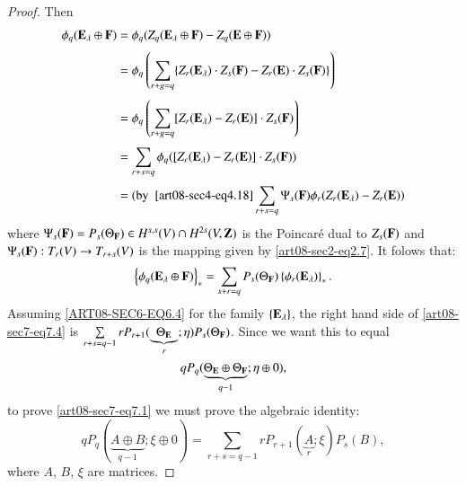 \begin{proof}
Then\pageoriginale
\begin{align*}
\phi_{q}(\mathbf{E}_{\lambda}\oplus\mathbf{F}) &= \phi_{q}(Z_{q}(\mathbf{E}_{\lambda}\oplus\mathbf{F})-Z_{q}(\mathbf{E}\oplus \mathbf{F}))\\[3pt]
&= \phi_{q}\left(\sum\limits_{r+g=q}\{Z_{r}(\mathbf{E}_{\lambda})\cdot Z_{s}(\mathbf{F})-Z_{r}(\mathbf{E})\cdot Z_{s}(\mathbf{F})\}\right)\\[3pt]
&= \phi_{q}\left(\sum\limits_{r+g=q}[Z_{r}(\mathbf{E}_{\lambda})-Z_{r}(\mathbf{E})]\cdot Z_{s}(\mathbf{F})\right)\\[3pt]
&= \sum\limits_{r+s=q}\phi_{q}([Z_{r}(\mathbf{E}_{\lambda})-Z_{r}(\mathbf{E})]\cdot Z_{s}(\mathbf{F}))\\[3pt]
&= (\text{by~ } \eqref{art08-sec4-eq4.18} \sum\limits_{r+s=q}\Psi_{s}(\mathbf{F})\phi_{r}(Z_{r}(\mathbf{E}_{\lambda})-Z_{r}(\mathbf{E}))
\end{align*}
where $\Psi_{s}(\mathbf{F})=P_{s}(\Theta_{\mathbf{F}})\in H^{s,s}(V)\cap H^{2s}(V,\mathbf{Z})$ is the Poincar\'e dual to $Z_{s}(\mathbf{F})$ and $\Psi_{s}(\mathbf{F}):T_{r}(V)\to T_{r+s}(V)$ is the mapping given by \eqref{art08-sec2-eq2.7}. It folows that:
\begin{equation}
\left\{\phi_{q}(\mathbf{E}_{\lambda}\oplus \mathbf{F})\right\}_{*}=\sum\limits_{s+r=q}P_{s}(\Theta_{\mathbf{F}})\left\{\phi_{r}(\mathbf{E}_{\lambda})\right\}_{*}.\label{art08-sec7-eq7.4}
\end{equation}
Assuming \eqref{ART08-SEC6-EQ6.4} for the family $\{\mathbf{E}_{\lambda}\}$, the right hand side of \eqref{art08-sec7-eq7.4} is $\sum\limits_{r+s=q-1}rP_{r+1}(\underbrace{\Theta_{\mathbf{E}}}_{r};\eta)P_{s}(\Theta_{\mathbf{F}})$. Since we want this to equal 
$$
qP_{q}(\underbrace{\Theta_{\mathbf{E}}\oplus \Theta_{\mathbf{F}}}_{q-1};\eta\oplus 0),
$$ 
to prove \eqref{art08-sec7-eq7.1} we must prove the algebraic identity:
\begin{equation}
qP_{q}(\underbrace{A\oplus B}_{q-1};\xi\oplus 0)=\sum\limits_{r+s=q-1}rP_{r+1}(\underbrace{A}_{r};\xi)P_{s}(B),\label{art08-sec7-eq7.5}
\end{equation}
where $A$, $B$, $\xi$ are matrices.


\end{proof}

